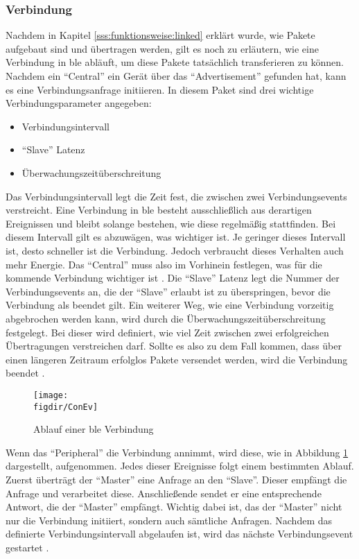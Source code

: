 \subsubsection{Verbindung}
\label{sss:funktionsweise:verbindung}

Nachdem in Kapitel \ref{sss:funktionsweise:linked} erklärt wurde, wie Pakete aufgebaut sind und übertragen werden, gilt es noch zu erläutern, wie eine Verbindung in \ac{ble} abläuft, um diese Pakete tatsächlich transferieren zu können. Nachdem ein "`Central"' ein Gerät über das "`Advertisement"' gefunden hat, kann es eine Verbindungsanfrage initiieren. In diesem Paket sind drei wichtige Verbindungsparameter angegeben:
\begin{itemize}
	\item{Verbindungsintervall}
	\item{"`Slave"' Latenz}
	\item{Überwachungszeitüberschreitung}
\end{itemize}
Das Verbindungsintervall legt die Zeit fest, die zwischen zwei Verbindungsevents verstreicht. Eine Verbindung in \ac{ble} besteht ausschließlich aus derartigen Ereignissen und bleibt solange bestehen, wie diese regelmäßig stattfinden. Bei diesem Intervall gilt es abzuwägen, was wichtiger ist. Je geringer dieses Intervall ist, desto schneller ist die Verbindung. Jedoch verbraucht dieses Verhalten auch mehr Energie. Das "`Central"' muss also im Vorhinein festlegen, was für die kommende Verbindung wichtiger ist \cite{CON:WWW}. Die "`Slave"' Latenz legt die Nummer der Verbindungsevents an, die der "`Slave"' erlaubt ist zu überspringen, bevor die Verbindung als beendet gilt. Ein weiterer Weg, wie eine Verbindung vorzeitig abgebrochen werden kann, wird durch die Überwachungszeitüberschreitung festgelegt. Bei dieser wird definiert, wie viel Zeit zwischen zwei erfolgreichen Übertragungen verstreichen darf. Sollte es also zu dem Fall kommen, dass über einen längeren Zeitraum erfolglos Pakete versendet werden, wird die Verbindung beendet \cite[Seite 23]{Townsend14:GSB}.\\

\begin{figure}[h]
	\centering
	\texttt{[image: \\figdir/ConEv]}
	\caption{Ablauf einer \ac{ble} Verbindung \cite{CON:WWW}}
	\label{FIG:conenv}
\end{figure}

\noindent Wenn das "`Peripheral"' die Verbindung annimmt, wird diese, wie in Abbildung \ref{FIG:conenv} dargestellt, aufgenommen. Jedes dieser Ereignisse folgt einem bestimmten Ablauf. Zuerst überträgt der "`Master"' eine Anfrage an den "`Slave"'. Dieser empfängt die Anfrage und verarbeitet diese. Anschließende sendet er eine entsprechende Antwort, die der "`Master"' empfängt. Wichtig dabei ist, das der "`Master"' nicht nur die Verbindung initiiert, sondern auch sämtliche Anfragen. Nachdem das definierte Verbindungsintervall abgelaufen ist, wird das nächste Verbindungsevent gestartet \cite{CON:WWW}.\\       

